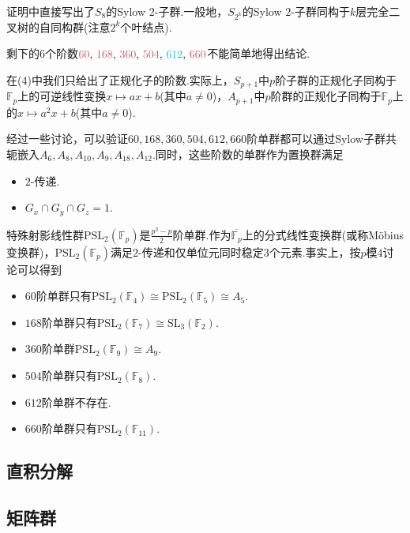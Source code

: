 \begin{remark}
	证明中直接写出了$S_8$的Sylow $2$-子群.一般地，$S_{2^k}$的Sylow $2$-子群同构于$k$层完全二叉树的自同构群(注意$2^k$个叶结点).
\end{remark}
\begin{remark}
	剩下的$6$个阶数${\color{IndianRed}60},\,{\color{IndianRed}168},\,{\color{IndianRed}360},\,{\color{IndianRed}504},\,{\color{DeepSkyBlue}612},\,{\color{IndianRed}660}$不能简单地得出结论.
	
	在(4)中我们只给出了正规化子的阶数.实际上，$S_{p+1}$中$p$阶子群的正规化子同构于$\mathbb{F}_p$上的可逆线性变换$x\mapsto ax+b$(其中$a\ne 0$)，$A_{p+1}$中$p$阶群的正规化子同构于$\mathbb{F}_p$上的$x\mapsto a^2x+b$(其中$a\ne 0$).

	经过一些讨论，可以验证$60,168,360,504,612,660$阶单群都可以通过Sylow子群共轭嵌入$A_6,A_8,A_{10},A_9,A_{18},A_{12}$.同时，这些阶数的单群作为置换群满足
	\begin{itemize}
		\item $2$-传递.
		\item $G_x\cap G_y\cap G_z=1$.
	\end{itemize}

	特殊射影线性群$\mathrm{PSL}_2(\mathbb{F}_p)$是$\frac{p^3-p}{2}$阶单群.作为$\overline{\mathbb{F}_p}$上的分式线性变换群(或称M\"obius变换群)，$\mathrm{PSL}_2(\mathbb{F}_p)$满足$2$-传递和仅单位元同时稳定$3$个元素.事实上，按$p$模$4$讨论可以得到
	\begin{itemize}
		\item $60$阶单群只有$\mathrm{PSL}_2(\mathbb{F}_4)\cong\mathrm{PSL}_2(\mathbb{F}_5)\cong A_5$.
		\item $168$阶单群只有$\mathrm{PSL}_2(\mathbb{F}_7)\cong\mathrm{SL}_3(\mathbb{F}_2)$.
		\item $360$阶单群$\mathrm{PSL}_2(\mathbb{F}_9)\cong A_9$.
		\item $504$阶单群只有$\mathrm{PSL}_2(\mathbb{F}_8)$.
		\item $612$阶单群不存在.
		\item $660$阶单群只有$\mathrm{PSL}_2(\mathbb{F}_{11})$.
	\end{itemize}
\end{remark}

\subsection{直积分解}

\subsection{矩阵群}

